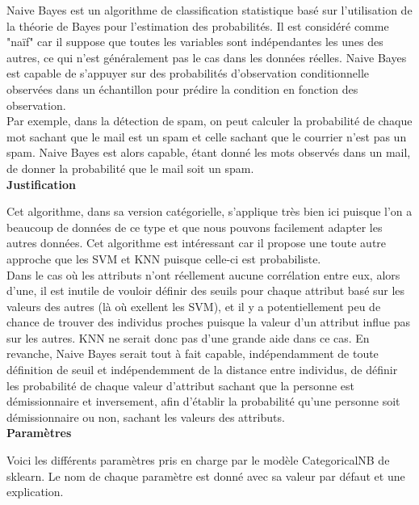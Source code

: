 \documentclass{ceri/sty/rapport}
\begin{document}
Naive Bayes est un algorithme de classification statistique basé sur l'utilisation de la théorie de Bayes pour l'estimation des probabilités. Il est considéré comme "naïf" car il suppose que toutes les variables sont indépendantes les unes des autres, ce qui n'est généralement pas le cas dans les données réelles. Naive Bayes est capable de s'appuyer sur des probabilités d'observation conditionnelle observées dans un échantillon pour prédire la condition en fonction des observation.\\
Par exemple, dans la détection de spam, on peut calculer la probabilité de chaque mot sachant que le mail est un spam et celle sachant que le courrier n'est pas un spam. Naive Bayes est alors capable, étant donné les mots observés dans un mail, de donner la probabilité que le mail soit un spam.\\

\textbf{Justification}

Cet algorithme, dans sa version catégorielle, s'applique très bien ici puisque l'on a beaucoup de données de ce type et que nous pouvons facilement adapter les autres données. Cet algorithme est intéressant car il propose une toute autre approche que les SVM et KNN puisque celle-ci est probabiliste.\\
Dans le cas où les attributs n'ont réellement aucune corrélation entre eux, alors d'une, il est inutile de vouloir définir des seuils pour chaque attribut basé sur les valeurs des autres (là où exellent les SVM), et il y a potentiellement peu de chance de trouver des individus proches puisque la valeur d'un attribut influe pas sur les autres. KNN ne serait donc pas d'une grande aide dans ce cas. En revanche, Naive Bayes serait tout à fait capable, indépendamment de toute définition de seuil et indépendemment de la distance entre individus, de définir les probabilité de chaque valeur d'attribut sachant que la personne est démissionnaire et inversement, afin d'établir la probabilité qu'une personne soit démissionnaire ou non, sachant les valeurs des attributs.\\

\textbf{Paramètres}

Voici les différents paramètres pris en charge par le modèle CategoricalNB de sklearn. Le nom de chaque paramètre est donné avec sa valeur par défaut et une explication.\\
\end{document}
